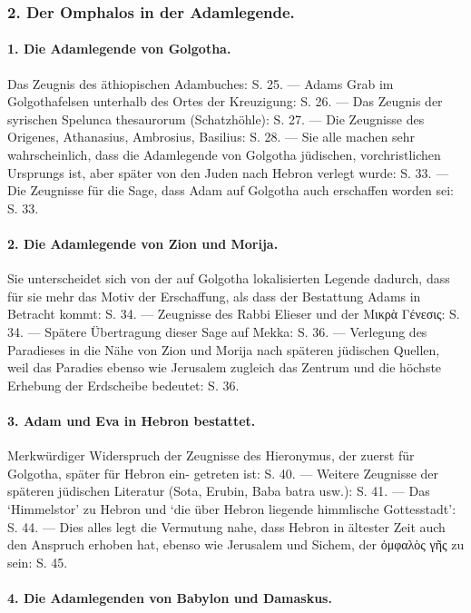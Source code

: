 \documentclass[a4paper, 11pt, oneside]{article}
\begin{document}
\subsubsection*{2. Der Omphalos in der Adamlegende.}
\paragraph*{1. Die Adamlegende von Golgotha.}
Das Zeugnis des äthiopischen Adambuches: S. 25. --- Adams Grab im Golgothafelsen unterhalb des Ortes der Kreuzigung: S. 26. --- Das Zeugnis der syrischen Spelunca thesaurorum (Schatzhöhle): S. 27. --- Die Zeugnisse des Origenes, Athanasius, Ambrosius, Basilius: S. 28. --- Sie alle machen sehr wahrscheinlich, dass die Adamlegende von Golgotha jüdischen, vorchristlichen Ursprungs ist, aber später von den Juden nach Hebron verlegt wurde: S. 33. --- Die Zeugnisse für die Sage, dass Adam auf Golgotha auch erschaffen worden sei: S. 33.

\paragraph*{2. Die Adamlegende von Zion und Morija.}
Sie unterscheidet sich von der auf Golgotha lokalisierten Legende dadurch, dass für sie mehr das Motiv der Erschaffung, als dass der Bestattung Adams in Betracht kommt: S. 34. --- Zeugnisse des Rabbi Elieser und der Μικρὰ Γένεσις: S. 34. --- Spätere Übertragung dieser Sage auf Mekka: S. 36. --- Verlegung des Paradieses in die Nähe von Zion und Morija nach späteren jüdischen Quellen, weil das Paradies ebenso wie Jerusalem zugleich das Zentrum und die höchste Erhebung der Erdscheibe bedeutet: S. 36.

\paragraph*{3. Adam und Eva in Hebron bestattet.}
Merkwürdiger Widerspruch der Zeugnisse des Hieronymus, der zuerst für Golgotha, später für Hebron ein- getreten ist: S. 40. --- Weitere Zeugnisse der späteren jüdischen Literatur (Sota, Erubin, Baba batra usw.): S. 41. --- Das `Himmelstor' zu Hebron und `die über Hebron liegende himmlische Gottesstadt': S. 44. --- Dies alles legt die Vermutung nahe, dass Hebron in ältester Zeit auch den Anspruch erhoben hat, ebenso wie Jerusalem und Sichem, der ὀμφαλὸς γῆς zu sein: S. 45.

\paragraph*{4. Die Adamlegenden von Babylon und Damaskus.}
\end{document}
